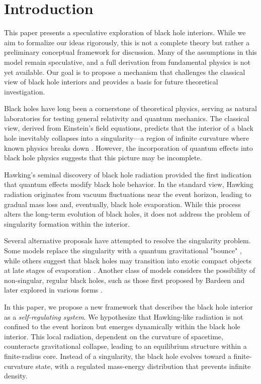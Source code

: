 \section{Introduction}

This paper presents a speculative exploration of black hole interiors. While we aim to formalize our ideas rigorously, this is not a complete theory but rather a preliminary conceptual framework for discussion. Many of the assumptions in this model remain speculative, and a full derivation from fundamental physics is not yet available. Our goal is to propose a mechanism that challenges the classical view of black hole interiors and provides a basis for future theoretical investigation.

Black holes have long been a cornerstone of theoretical physics, serving as natural laboratories for testing general relativity and quantum mechanics. The classical view, derived from Einstein's field equations, predicts that the interior of a black hole inevitably collapses into a singularity—a region of infinite curvature where known physics breaks down \cite{penrose1965singularity}. However, the incorporation of quantum effects into black hole physics suggests that this picture may be incomplete.

Hawking's seminal discovery of black hole radiation \cite{hawking1975particle} provided the first indication that quantum effects modify black hole behavior. In the standard view, Hawking radiation originates from vacuum fluctuations near the event horizon, leading to gradual mass loss and, eventually, black hole evaporation. While this process alters the long-term evolution of black holes, it does not address the problem of singularity formation within the interior.

Several alternative proposals have attempted to resolve the singularity problem. Some models replace the singularity with a quantum gravitational "bounce" \cite{bojowald2005nonsingular}, while others suggest that black holes may transition into exotic compact objects at late stages of evaporation \cite{frolov2017information}. Another class of models considers the possibility of non-singular, regular black holes, such as those first proposed by Bardeen \cite{bardeen1968non} and later explored in various forms \cite{hayward2006formation}.

In this paper, we propose a new framework that describes the black hole interior as a \textit{self-regulating system}. We hypothesize that Hawking-like radiation is not confined to the event horizon but emerges dynamically within the black hole interior. This local radiation, dependent on the curvature of spacetime, counteracts gravitational collapse, leading to an equilibrium structure within a finite-radius core. Instead of a singularity, the black hole evolves toward a finite-curvature state, with a regulated mass-energy distribution that prevents infinite density. 

